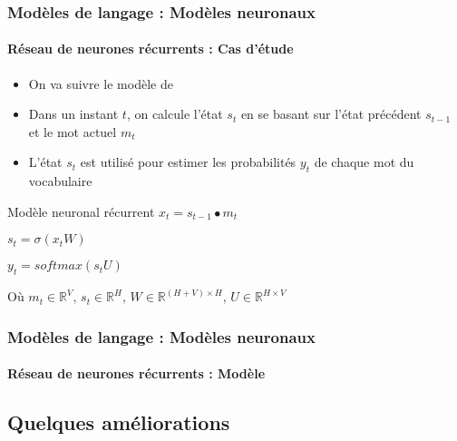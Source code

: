 \documentclass[xcolor=table]{beamer}
\begin{document}
\begin{frame}
\frametitle{Modèles de langage : Modèles neuronaux}
\framesubtitle{Réseau de neurones récurrents : Cas d'étude}

\begin{itemize}
	\item On va suivre le modèle de \cite{2010-mokolov-al}
	\item Dans un instant $t$, on calcule l'état $s_t$ en se basant sur l'état précédent $s_{t-1}$ et le mot actuel $m_t$
	\item L'état $s_t$ est utilisé pour estimer les probabilités $y_t$ de chaque mot du vocabulaire
\end{itemize}

\begin{block}{Modèle neuronal récurrent}
	$x_t = s_{t-1} \bullet m_t$
	
	$s_t = \sigma(x_t W)$
	
	$y_t = softmax(s_t U)$
	
	Où $m_t \in \mathbb{R}^{V},\, s_t \in \mathbb{R}^{H},\, W \in \mathbb{R}^{(H+V)\times H},\, U \in \mathbb{R}^{H\times V}$
\end{block}

\end{frame}

\begin{frame}
\frametitle{Modèles de langage : Modèles neuronaux}
\framesubtitle{Réseau de neurones récurrents : Modèle}


\end{frame}

\subsection{Quelques améliorations}
\end{document}
